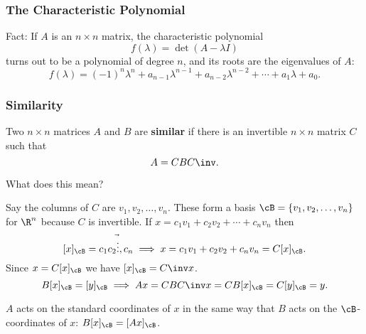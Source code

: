 
\begin{frame}
\frametitle{The Characteristic Polynomial}

\displayskips{3mm}
\alert{Fact:}
If $A$ is an $n\times n$ matrix, the characteristic polynomial
\[ f(\lambda) = \det(A-\lambda I) \]
turns out to be a polynomial of degree $n$, and its roots are the eigenvalues of
$A$:
\[ f(\lambda) 
= (-1)^n\lambda^n + a_{n-1}\lambda^{n-1} + a_{n-2}\lambda^{n-2} + \cdots +
a_1\lambda + a_0. \]

\ifx\slidesmode\blankmode{}\fi

\end{frame}



\begin{frame}
\frametitle{Similarity}

\vskip-3mm
\begin{defn}
  Two $n\times n$ matrices $A$ and $B$ are \textbf{similar} if there is an
  invertible $n\times n$ matrix $C$ such that
  \[ A = CBC\inv. \]
\end{defn}

\pause
\alert{What does this mean?}
\begin{webonly}
Say the columns of $C$ are $v_1,v_2,\ldots,v_n$.
These form a basis $\cB = \{v_1,v_2,\ldots,v_n\}$ for $\R^n$ because $C$ is invertible.
If $x = c_1v_1 + c_2v_2 + \cdots + c_nv_n$ then 
\displayskips{5pt}
\[ [x]_\cB = 
\vec{c_1 c_2 \vdots, c_n}
\implies x = c_1v_1 + c_2v_2 + c_nv_n
= C[x]_\cB. \]
Since $x = C[x]_\cB$ we have $[x]_\cB = C\inv x$.
\[ B[x]_\cB = [y]_\cB \implies Ax = CBC\inv x = CB[x]_\cB = C[y]_\cB = y. \]
\end{webonly}

\pause
\begin{bluebox}{.8\linewidth}
  $A$ acts on the standard coordinates of $x$ in the same way that $B$ acts
  on the $\cB$-coordinates of $x$: $B[x]_\cB = [Ax]_\cB$.
\end{bluebox}

\end{frame}



